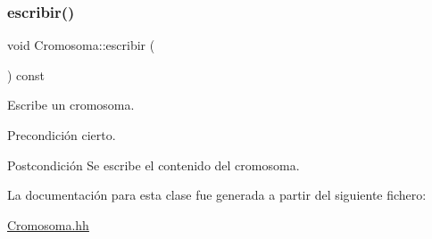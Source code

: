 \subsubsection{\texorpdfstring{escribir()}{escribir()}}
{\footnotesize\ttfamily void Cromosoma\+::escribir (\begin{DoxyParamCaption}{ }\end{DoxyParamCaption}) const}



Escribe un cromosoma. 

\begin{DoxyPrecond}{Precondición}
cierto. 
\end{DoxyPrecond}
\begin{DoxyPostcond}{Postcondición}
Se escribe el contenido del cromosoma. 
\end{DoxyPostcond}


La documentación para esta clase fue generada a partir del siguiente fichero\+:\begin{DoxyCompactItemize}
\item 
\hyperlink{_cromosoma_8hh}{Cromosoma.\+hh}\end{DoxyCompactItemize}

